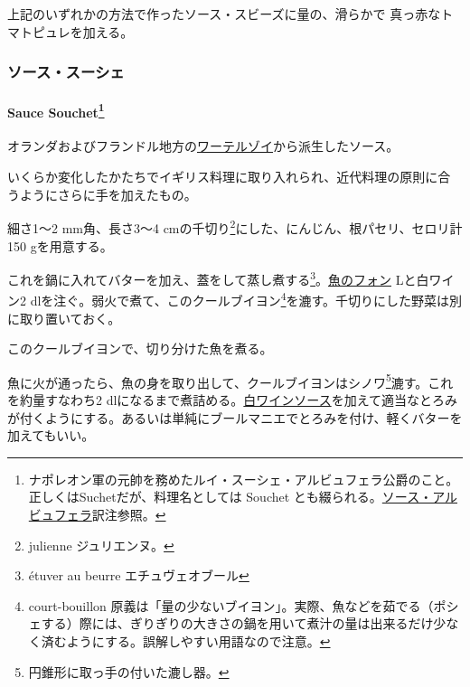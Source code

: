 \begin{recette}

上記のいずれかの方法で作ったソース・スビーズに\untiers{}量の、滑らかで
真っ赤なトマトピュレを加える。

\maeaki

\hypertarget{ux30bdux30fcux30b9ux30b9ux30fcux30b7ux30a7}{%
\subsubsection{ソース・スーシェ}\label{ux30bdux30fcux30b9ux30b9ux30fcux30b7ux30a7}}

\hypertarget{sauce-souchet139}{%
\paragraph[Sauce Souchet]{\texorpdfstring{Sauce Souchet\footnote{ナポレオン軍の元帥を務めたルイ・スーシェ・アルビュフェラ公爵のこと。
  正しくはSuchetだが、料理名としては Souchet
  とも綴られる。\protect\hyperlink{sauce-albufera}{ソース・アルビュフェラ}訳注参照。}}{Sauce Souchet}}\label{sauce-souchet139}}


オランダおよびフランドル地方の\protect\hyperlink{}{ワーテルゾイ}から派生したソース。

いくらか変化したかたちでイギリス料理に取り入れられ、近代料理の原則に合
うようにさらに手を加えたもの。

細さ1〜2 mm角、長さ3〜4 cmの千切り\footnote{julienne ジュリエンヌ。}にした、にんじん、根パセリ、セロリ計150
gを用意する。

これを鍋に入れてバターを加え、蓋をして蒸し煮する\footnote{étuver au
  beurre エチュヴェオブール}。\protect\hyperlink{fumet-de-poisson}{魚のフォン}\troisquarts{}
Lと白ワイン2 dlを注ぐ。弱火で煮て、このクールブイヨン\footnote{court-bouillon
  原義は「量の少ないブイヨン」。実際、魚などを茹でる（ポシェする）際には、ぎりぎりの大きさの鍋を用いて煮汁の量は出来るだけ少なく済むようにする。誤解しやすい用語なので注意。}を漉す。千切りにした野菜は別に取り置いておく。

このクールブイヨンで、切り分けた魚を煮る。

魚に火が通ったら、魚の身を取り出して、クールブイヨンはシノワ\footnote{円錐形に取っ手の付いた漉し器。}漉す。これを約\unquart{}量すなわち2\undemi{}
dlになるまで煮詰める。\protect\hyperlink{sauce-vin-blanc}{白ワインソース}を加えて適当なとろみが付くようにする。あるいは単純にブールマニエでとろみを付け、軽くバターを加えてもいい。


\end{recette}

